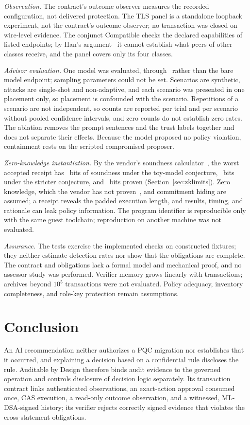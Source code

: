 \documentclass[journal]{IEEEtran}
\newcommand{\Compatible}{\mathrm{Compatible}}
\begin{document}
\emph{Observation.} The contract's outcome observer measures the recorded configuration, not delivered protection. The TLS panel is a standalone loopback experiment, not the contract's outcome observer; no transaction was closed on wire-level evidence. The conjunct $\Compatible$ checks the declared capabilities of listed endpoints; by Han's argument~\cite{han} it cannot establish what peers of other classes receive, and the panel covers only its four classes.

\emph{Advisor evaluation.} One model was evaluated, through \AdvInterface\ rather than the bare model endpoint; sampling parameters could not be set. Scenarios are synthetic, attacks are single-shot and non-adaptive, and each scenario was presented in one placement only, so placement is confounded with the scenario. Repetitions of a scenario are not independent, so counts are reported per trial and per scenario without pooled confidence intervals, and zero counts do not establish zero rates. The ablation removes the prompt sentences and the trust labels together and does not separate their effects. Because the model proposed no policy violation, containment rests on the scripted compromised proposer.

\emph{Zero-knowledge instantiation.} By the vendor's soundness calculator~\cite{risc0}, the worst accepted receipt has \ZkEndBits~bits of soundness under the toy-model conjecture, \ZkStrictBits~bits under the stricter conjecture, and \ZkProvenBits~bits proven (Section~\ref{sec:zklimits}). Zero knowledge, which the vendor has not proven~\cite{risc0sec}, and commitment hiding are assumed; a receipt reveals the padded execution length, and results, timing, and rationale can leak policy information. The program identifier is reproducible only with the same guest toolchain; reproduction on another machine was not evaluated.

\emph{Assurance.} The tests exercise the implemented checks on constructed fixtures; they neither estimate detection rates nor show that the obligations are complete. The contract and obligations lack a formal model and mechanical proof, and no assessor study was performed. Verifier memory grows linearly with transactions; archives beyond $10^5$ transactions were not evaluated. Policy adequacy, inventory completeness, and role-key protection remain assumptions.

\section{Conclusion}
An AI recommendation neither authorizes a PQC migration nor establishes that it occurred, and explaining a decision based on a confidential rule discloses the rule. Auditable by Design therefore binds audit evidence to the governed operation and controls disclosure of decision logic separately. Its transaction contract links authenticated observations, an exact-action approval consumed once, CAS execution, a read-only outcome observation, and a witnessed, ML-DSA-signed history; its verifier rejects correctly signed evidence that violates the cross-statement obligations.
\end{document}

